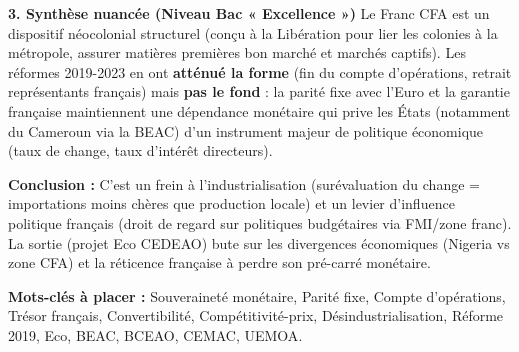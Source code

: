 \documentclass[11pt]{article}
\newcommand{\cle}[1]{{\popxbold\color{popdark}#1}}
\begin{document}
\begin{exoresolu}
\textbf{3. Synthèse nuancée (Niveau Bac « Excellence »)}
Le Franc CFA est un \cle{dispositif néocolonial structurel} (conçu à la Libération pour lier les colonies à la métropole, assurer matières premières bon marché et marchés captifs). Les réformes 2019-2023 en ont \textbf{atténué la forme} (fin du compte d'opérations, retrait représentants français) mais \textbf{pas le fond} : la parité fixe avec l'Euro et la garantie française maintiennent une \cle{dépendance monétaire} qui prive les États (notamment du Cameroun via la BEAC) d'un instrument majeur de politique économique (taux de change, taux d'intérêt directeurs).
\par \textbf{Conclusion :} C'est un \cle{frein à l'industrialisation} (surévaluation du change = importations moins chères que production locale) et un \cle{levier d'influence politique} français (droit de regard sur politiques budgétaires via FMI/zone franc). La sortie (projet \cle{Eco} CEDEAO) bute sur les divergences économiques (Nigeria vs zone CFA) et la réticence française à perdre son pré-carré monétaire.

\par \textbf{Mots-clés à placer :} \cle{Souveraineté monétaire}, \cle{Parité fixe}, \cle{Compte d'opérations}, \cle{Trésor français}, \cle{Convertibilité}, \cle{Compétitivité-prix}, \cle{Désindustrialisation}, \cle{Réforme 2019}, \cle{Eco}, \cle{BEAC}, \cle{BCEAO}, \cle{CEMAC}, \cle{UEMOA}.
\end{exoresolu}
\end{document}
